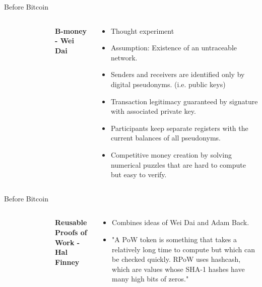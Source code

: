 \documentclass[]{beamer}
\begin{document}
\begin{frame}{Before Bitcoin}
\begin{columns}
\begin{figure}
	\begin{tikzpicture}[scale=1]
			
	\end{tikzpicture}
\end{figure}
	\textbf{B-money - Wei Dai} \\
	\vspace{0.5em}
	\begin{small}
	\begin{itemize}
		\item Thought experiment
		\item Assumption: Existence of an untraceable network.
		\item Senders and receivers are identified only by digital pseudonyms. (i.e. public keys) 
		\item Transaction legitimacy guaranteed by signature with associated private key.
		\item Participants keep separate registers with the current balances of all pseudonyms.
		\item Competitive money creation by solving numerical puzzles that are hard to compute but easy to verify.
	\end{itemize}
	\end{small}
\end{columns}
\end{frame}


\begin{frame}{Before Bitcoin}
\begin{columns}
\begin{figure}
	\begin{tikzpicture}[scale=1]
			
	\end{tikzpicture}
\end{figure}
	\textbf{Reusable Proofs of Work - Hal Finney}
	\vspace{0.5em}
	\begin{small}
	\begin{itemize}
		\item Combines ideas of Wei Dai and Adam Back.
		\item "A PoW token is something that takes a relatively long time to compute but which can be checked quickly. RPoW uses hashcash, which are values whose SHA-1 hashes have many high bits of zeros."
	\end{itemize}
	\end{small}
\end{columns}
\end{frame}
\end{document}
